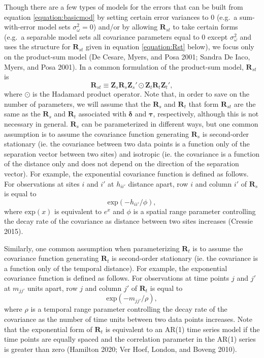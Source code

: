 \documentclass[]{article}    %
\begin{document}
Though there are a few types of models for the errors that can be built
from equation \ref{equation:basicmod} by setting certain error variances
to 0 (e.g.~a sum-with-error model sets \(\sigma^2_{\omega} = 0\)) and/or
by allowing \(\mathbf{R}_{st}\) to take certain forms (e.g.~a separable
model sets all covariance parameters equal to \(0\) except
\(\sigma^2_{\omega}\) and uses the structure for \(\mathbf{R}_{st}\)
given in equation \ref{equation:Rst} below), we focus only on the
product-sum model (De Cesare, Myers, and Posa 2001; Sandra De Iaco,
Myers, and Posa 2001). In a common formulation of the product-sum model,
\(\mathbf{R}_{st}\) is \mbox{} \begin{equation}
\label{equation:Rst}
\mathbf{R}_{st} \equiv \mathbf{Z}_{s} \mathbf{R}_{s} \mathbf{Z}_{s}' \odot \mathbf{Z}_t \mathbf{R}_t \mathbf{Z}_t',
\end{equation} \noindent where \(\odot\) is the Hadamard product
operator. Note that, in order to save on the number of parameters, we
will assume that the \(\mathbf{R}_s\) and \(\mathbf{R}_t\) that form
\(\mathbf{R}_{st}\) are the same as the \(\mathbf{R}_s\) and
\(\mathbf{R}_t\) associated with \(\bm{\delta}\) and \(\bm{\tau}\),
respectively, although this is not necessary in general.
\(\mathbf{R}_s\) can be parameterized in different ways, but one common
assumption is to assume the covariance function generating
\(\mathbf{R}_s\) is second-order stationary (ie. the covariance between
two data points is a function only of the separation vector between two
sites) and isotropic (ie. the covariance is a function of the distance
only and does not depend on the direction of the separation vector). For
example, the exponential covariance function is defined as follows. For
observations at sites \(i\) and \(i'\) at \(h_{ii'}\) distance apart,
row \(i\) and column \(i'\) of \(\mathbf{R}_{s}\) is equal to \mbox{}
\begin{equation}
\label{equation:spatcov}
\text{exp}(-h_{ii'} / \phi),
\end{equation} \noindent where \(\text{exp}(x)\) is equivalent to
\(e^x\) and \(\phi\) is a spatial range parameter controlling the decay
rate of the covariance as distance between two sites increases (Cressie
2015).

Similarly, one common assumption when parameterizing \(\mathbf{R}_t\) is
to assume the covariance function generating \(\mathbf{R}_t\) is
second-order stationary (ie. the covariance is a function only of the
temporal distance). For example, the exponential covariance function is
defined as follows. For observations at time points \(j\) and \(j'\) at
\(m_{jj'}\) units apart, row \(j\) and column \(j'\) of
\(\mathbf{R}_{t}\) is equal to \mbox{} \begin{equation}
\label{equation:tempcov}
\text{exp}(-m_{jj'} / \rho),
\end{equation} \noindent where \(\rho\) is a temporal range parameter
controlling the decay rate of the covariance as the number of time units
between two data points increases. Note that the exponential form of
\(\mathbf{R}_t\) is equivalent to an AR(1) time series model if the time
points are equally spaced and the correlation parameter in the AR(1)
series is greater than zero (Hamilton 2020; Ver Hoef, London, and Boveng
2010).
\end{document}
